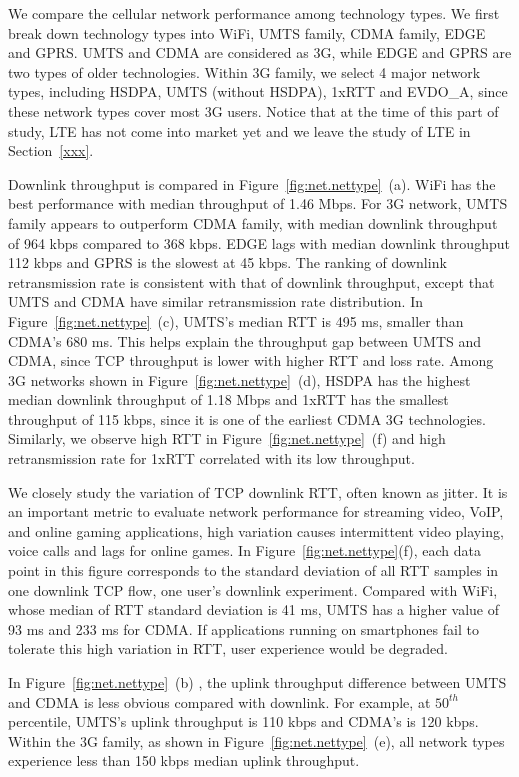 We compare the cellular network performance among technology types. We first break down technology types into WiFi, UMTS family, CDMA family, EDGE and GPRS. UMTS and CDMA are considered as 3G, while EDGE and GPRS are two types of older technologies. 
Within 3G family, we select 4 major network types, including HSDPA, UMTS (without HSDPA), 1xRTT and EVDO\_A, since these network types cover most 3G users. Notice that at the time of this part of study, LTE has not come into market yet and we leave the study of LTE in Section~\ref{xxx}.

Downlink throughput is compared in Figure~\ref{fig:net.nettype}~(a).
WiFi has the best performance with median throughput of 1.46 Mbps. For
3G network, UMTS family appears to outperform CDMA family, with median
downlink throughput of 964 kbps compared to 368 kbps. EDGE lags
with median downlink throughput 112 kbps and GPRS is the slowest at 45
kbps. The ranking of downlink retransmission rate is consistent with
that of downlink throughput, except that UMTS and CDMA have similar
retransmission rate distribution. In
Figure~\ref{fig:net.nettype}~(c), UMTS's median RTT is 495 ms,
smaller than CDMA's 680 ms. This helps explain the throughput gap
between UMTS and CDMA, since TCP throughput is lower with higher RTT
and loss rate. Among 3G networks shown in
Figure~\ref{fig:net.nettype}~(d), HSDPA has the highest median
downlink throughput of 1.18 Mbps and 1xRTT has the smallest throughput of 115 kbps, since it is one of the earliest CDMA 3G technologies. Similarly, we observe high RTT in Figure~\ref{fig:net.nettype}~(f) and high retransmission rate for 1xRTT correlated with its low throughput.

We closely study the variation of TCP downlink RTT, often known as jitter. It is an important metric to evaluate network performance for streaming video, VoIP, and online gaming applications, \eg high variation causes intermittent video playing, voice calls and lags for online games. In Figure~\ref{fig:net.nettype}(f), each data point in this figure corresponds to the standard deviation of all RTT samples in one downlink TCP flow, \ie one user's downlink experiment. Compared with WiFi, whose median of RTT standard deviation is 41 ms, UMTS has a higher value of 93 ms and 233 ms for CDMA. If applications running on smartphones fail to tolerate this high variation in RTT, user experience would be degraded.

In Figure~\ref{fig:net.nettype}~(b) , the uplink throughput difference between UMTS and CDMA is less obvious compared with downlink. For example, at $50^{th}$ percentile, UMTS's uplink throughput is 110 kbps and CDMA's is 120 kbps. Within the 3G family, as shown in Figure~\ref{fig:net.nettype}~(e), all network types experience less than 150 kbps median uplink throughput.

